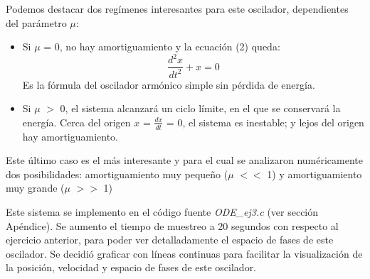 \documentclass[a4paper,12pt]{article}
\begin{document}
Podemos destacar dos reg\'imenes interesantes para este oscilador, dependientes del par\'ametro $\mu$:

\begin{itemize}
\item Si $\mu$ = 0, no hay amortiguamiento y la ecuaci\'on (2) queda:
$$ \frac{d^2 x}{dt^2} + x = 0 $$
Es la f\'ormula del oscilador arm\'onico simple sin p\'erdida de energ\'ia.
\item Si $\mu$ $>$ 0, el sistema alcanzar\'a un ciclo l\'imite, en el que se conservar\'a la energ\'ia. Cerca del origen $x$ = $\frac{dx}{dt}$ = 0, el sistema es inestable; y lejos del origen hay amortiguamiento.
\end{itemize}

Este \'ultimo caso es el m\'as interesante y para el cual se analizaron num\'ericamente dos posibilidades: amortiguamiento muy peque\~no ($\mu$ $<<$ 1) y amortiguamiento muy grande ($\mu$ $>>$ 1)

Este sistema se implemento en el c\'odigo fuente \textit{ODE\_ej3.c} (ver secci\'on Ap\'endice). Se aumento el tiempo de muestreo a 20 segundos con respecto al ejercicio anterior, para poder ver detalladamente el espacio de fases de este oscilador.
Se decidi\'o graficar con l\'ineas continuas para facilitar la visualizaci\'on de la posici\'on, velocidad y espacio de fases de este oscilador.
\end{document}
